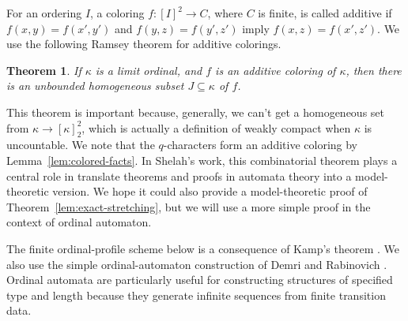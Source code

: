 \documentclass{amsart}
\newtheorem{theorem}{Theorem}
\theoremstyle{definition}
\begin{document}
For an ordering $I$, a coloring $f\colon[I]^2\to C$, where $C$ is finite, is called additive if $f(x,y)=f(x',y')$ and $f(y,z)=f(y',z')$ imply $f(x,z)=f(x',z')$. We use the following Ramsey theorem for additive colorings.
\begin{theorem}\label{theorem: Additivity Ramsey}
    If $\kappa$ is a limit ordinal, and $f$ is an additive coloring of $\kappa$, then there is an unbounded homogeneous subset $J\subseteq\kappa$ of $f$.
\end{theorem}
This theorem is important because, generally, we can't get a homogeneous set from $\kappa\to[\kappa]^2_2$, which is actually a definition of weakly compact when $\kappa$ is uncountable. We note that the $q$-characters form an additive coloring by Lemma~\ref{lem:colored-facts}. In Shelah's work\cite{Shelah1975}, this combinatorial theorem plays a central role in translate theorems and proofs in automata theory into a model-theoretic version. We hope it could also provide a model-theoretic proof of Theorem~\ref{lem:exact-stretching}, but we will use a more simple proof in the context of ordinal automaton.

The finite ordinal-profile scheme below is a consequence of Kamp's theorem
\cite{Kamp1968}.  We also use the simple ordinal-automaton construction of
Demri and Rabinovich \cite[Theorem~1.1, Definition~2.1, and
Lemma~2.3]{DemriRabinovich2010}. Ordinal automata are particularly useful for constructing structures of specified type and length because they generate infinite sequences from finite transition data.
\end{document}
